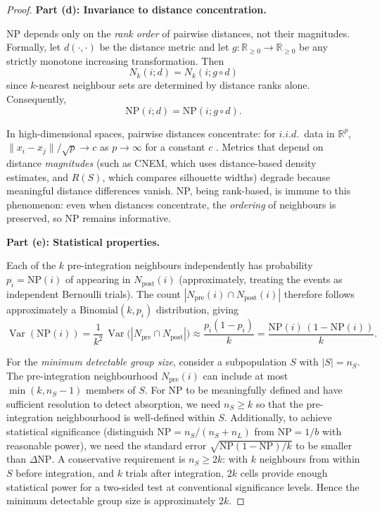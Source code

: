 \documentclass[10pt]{article}
\DeclareMathOperator{\Var}{Var}
\begin{document}
\begin{proof}
\medskip
\textbf{Part (d): Invariance to distance concentration.}

NP depends only on the \emph{rank order} of pairwise distances, not their
magnitudes.  Formally, let $d(\cdot,\cdot)$ be the distance metric and let
$g \colon \mathbb{R}_{\ge 0} \to \mathbb{R}_{\ge 0}$ be any strictly
monotone increasing transformation.  Then
\[
    N_k(i; d) = N_k(i; g \circ d)
\]
since $k$-nearest neighbour sets are determined by distance ranks alone.
Consequently,
\[
    \mathrm{NP}(i; d) = \mathrm{NP}(i; g \circ d).
\]

In high-dimensional spaces, pairwise distances concentrate: for $i.i.d.$\
data in $\mathbb{R}^p$,
$\|x_i - x_j\| / \sqrt{p} \to c$ as $p \to \infty$ for a constant $c$
\cite{beyer1999nearest}.  Metrics that depend on distance \emph{magnitudes}
(such as CNEM, which uses distance-based density estimates, and $R(S)$,
which compares silhouette widths) degrade because meaningful distance
differences vanish.  NP, being rank-based, is immune to this phenomenon:
even when distances concentrate, the \emph{ordering} of neighbours is
preserved, so NP remains informative.

\medskip
\textbf{Part (e): Statistical properties.}

Each of the $k$ pre-integration neighbours independently has probability
$p_i = \mathrm{NP}(i)$ of appearing in $N_{\mathrm{post}}(i)$
(approximately, treating the events as independent Bernoulli trials).
The count $|N_{\mathrm{pre}}(i) \cap N_{\mathrm{post}}(i)|$ therefore
follows approximately a $\mathrm{Binomial}(k, p_i)$ distribution, giving
\[
    \Var(\mathrm{NP}(i))
    = \frac{1}{k^2}\,\Var\bigl(|N_{\mathrm{pre}} \cap N_{\mathrm{post}}|\bigr)
    \approx \frac{p_i(1 - p_i)}{k}
    = \frac{\mathrm{NP}(i)\,(1 - \mathrm{NP}(i))}{k}.
\]

For the \emph{minimum detectable group size}, consider a subpopulation $S$
with $|S| = n_S$.  The pre-integration neighbourhood $N_{\mathrm{pre}}(i)$
can include at most $\min(k, n_S - 1)$ members of $S$.  For NP to be
meaningfully defined and have sufficient resolution to detect absorption,
we need $n_S \ge k$ so that the pre-integration neighbourhood is
well-defined within $S$.  Additionally, to achieve statistical significance
(distinguish $\mathrm{NP} = n_S/(n_S + n_L)$ from $\mathrm{NP} = 1/b$
with reasonable power), we need the standard error
$\sqrt{\mathrm{NP}(1-\mathrm{NP})/k}$ to be smaller than
$\Delta\mathrm{NP}$.  A conservative requirement is $n_S \ge 2k$: with $k$
neighbours from within $S$ before integration, and $k$ trials after
integration, $2k$ cells provide enough statistical power for a two-sided
test at conventional significance levels.  Hence the minimum detectable
group size is approximately $2k$.
\end{proof}
\end{document}
